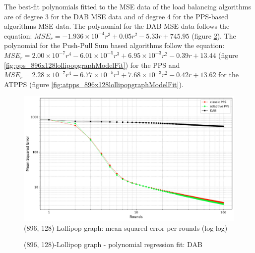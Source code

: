 The best-fit polynomials fitted to the MSE data of the load balancing algorithms are of degree 3 for the DAB MSE data and of degree 4 for the PPS-based algorithms MSE data. The polynomial for the DAB MSE data follows the equation: $MSE_r=-1.936\times 10^{-4}r^{3}+0.05r^{2}-5.33r+745.95$ (figure \ref{fig:dab_896x128lollipopgraphModelFit}). The polynomial for the Push-Pull Sum based algorithms follow the equation: $MSE_r=2.00\times 10^{-7}r^{4}-6.01\times 10^{-5}r^{3}+6.95\times 10^{-3}r^{2}-0.39r+13.44$ (figure \ref{fig:pps_896x128lollipopgraphModelFit}) for the PPS and $MSE_r=2.28\times 10^{-7}r^{4}-6.77\times 10^{-5}r^{3}+7.68\times 10^{-3}r^{2}-0.42r+13.62$ for the ATPPS (figure \ref{fig:atpps_896x128lollipopgraphModelFit}). 
\begin{figure}[]
    \centering
    \includegraphics[width=\linewidth]{figures/Simulation_outcomes/LollipopGraph/896_128/DAB_vs_PPS_LG_r100_n1024_averaged_loglog.png}
    \caption{(896, 128)-Lollipop graph: mean squared error per rounds (log-log)}
    \label{fig:896_128lollipopgraphMSEperRoundLogLog}
\end{figure}

\begin{figure}[]
    \centering
    \caption{(896, 128)-Lollipop graph - polynomial regression fit: DAB}
    \label{fig:dab_896x128lollipopgraphModelFit}
\end{figure}

